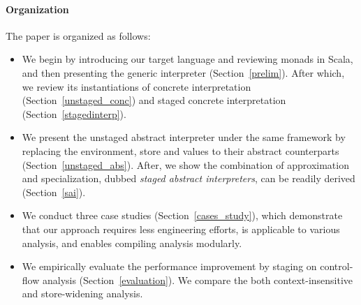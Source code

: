 \paragraph{Organization} The paper is organized as follows:
\begin{itemize}[leftmargin=2em]
  \item We begin by introducing our target language and reviewing
    monads in Scala, and then presenting the generic interpreter (Section~\ref{prelim}).
    After which, we review its instantiations of concrete interpretation
    (Section~\ref{unstaged_conc}) and staged concrete interpretation
    (Section~\ref{stagedinterp}).
  \item We present the unstaged abstract interpreter under the same framework by
    replacing the environment, store and values to their abstract counterparts (Section~\ref{unstaged_abs}).
    After, we show the combination of approximation and specialization, dubbed
    \textit{staged abstract interpreters}, can be readily derived (Section~\ref{sai}).
  \item We conduct three case studies (Section~\ref{cases_study}), which demonstrate that
    our approach requires less engineering efforts, is applicable to various analysis,
    and enables compiling analysis modularly.
  \item We empirically evaluate the performance improvement by staging on
    control-flow analysis (Section~\ref{evaluation}). We compare the both
    context-insensitive and store-widening analysis.
\end{itemize}

\iffalse
On the other side, static analysis is a tradeoff between performance and
precision: higher precision usually leads to longer running time.

4. Existing method to improve the performance is adhoc, engineering heavy, require to rewrite the optimized version, therefore harder to reason about the correctness
6. program analyzers are also meta-programs, they manipulate other programs as data objects
\fi
